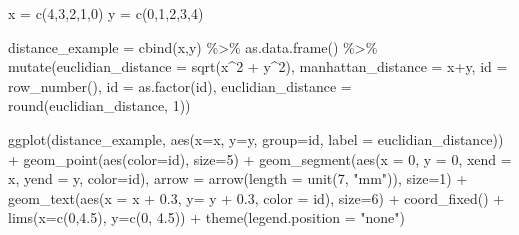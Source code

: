 \documentclass[
]{book}
\newenvironment{Shaded}{\begin{snugshade}}{\end{snugshade}}
\newcommand{\AttributeTok}[1]{\textcolor[rgb]{0.77,0.63,0.00}{#1}}
\newcommand{\DecValTok}[1]{\textcolor[rgb]{0.00,0.00,0.81}{#1}}
\newcommand{\FloatTok}[1]{\textcolor[rgb]{0.00,0.00,0.81}{#1}}
\newcommand{\FunctionTok}[1]{\textcolor[rgb]{0.00,0.00,0.00}{#1}}
\newcommand{\NormalTok}[1]{#1}
\newcommand{\OtherTok}[1]{\textcolor[rgb]{0.56,0.35,0.01}{#1}}
\newcommand{\SpecialCharTok}[1]{\textcolor[rgb]{0.00,0.00,0.00}{#1}}
\newcommand{\StringTok}[1]{\textcolor[rgb]{0.31,0.60,0.02}{#1}}
\begin{document}
\begin{Shaded}
\begin{Highlighting}[]
\NormalTok{x }\OtherTok{=} \FunctionTok{c}\NormalTok{(}\DecValTok{4}\NormalTok{,}\DecValTok{3}\NormalTok{,}\DecValTok{2}\NormalTok{,}\DecValTok{1}\NormalTok{,}\DecValTok{0}\NormalTok{)}
\NormalTok{y }\OtherTok{=} \FunctionTok{c}\NormalTok{(}\DecValTok{0}\NormalTok{,}\DecValTok{1}\NormalTok{,}\DecValTok{2}\NormalTok{,}\DecValTok{3}\NormalTok{,}\DecValTok{4}\NormalTok{)}

\NormalTok{distance\_example }\OtherTok{=} \FunctionTok{cbind}\NormalTok{(x,y) }\SpecialCharTok{\%\textgreater{}\%}
  \FunctionTok{as.data.frame}\NormalTok{() }\SpecialCharTok{\%\textgreater{}\%}
  \FunctionTok{mutate}\NormalTok{(}\AttributeTok{euclidian\_distance =} \FunctionTok{sqrt}\NormalTok{(x}\SpecialCharTok{\^{}}\DecValTok{2} \SpecialCharTok{+}\NormalTok{ y}\SpecialCharTok{\^{}}\DecValTok{2}\NormalTok{),}
         \AttributeTok{manhattan\_distance =}\NormalTok{ x}\SpecialCharTok{+}\NormalTok{y,}
         \AttributeTok{id =} \FunctionTok{row\_number}\NormalTok{(),}
         \AttributeTok{id =} \FunctionTok{as.factor}\NormalTok{(id),}
         \AttributeTok{euclidian\_distance =} \FunctionTok{round}\NormalTok{(euclidian\_distance, }\DecValTok{1}\NormalTok{))}

\FunctionTok{ggplot}\NormalTok{(distance\_example, }\FunctionTok{aes}\NormalTok{(}\AttributeTok{x=}\NormalTok{x, }\AttributeTok{y=}\NormalTok{y, }\AttributeTok{group=}\NormalTok{id, }\AttributeTok{label =}\NormalTok{ euclidian\_distance)) }\SpecialCharTok{+}
  \FunctionTok{geom\_point}\NormalTok{(}\FunctionTok{aes}\NormalTok{(}\AttributeTok{color=}\NormalTok{id), }\AttributeTok{size=}\DecValTok{5}\NormalTok{) }\SpecialCharTok{+}
  \FunctionTok{geom\_segment}\NormalTok{(}\FunctionTok{aes}\NormalTok{(}\AttributeTok{x =} \DecValTok{0}\NormalTok{, }\AttributeTok{y =} \DecValTok{0}\NormalTok{, }\AttributeTok{xend =}\NormalTok{ x, }\AttributeTok{yend =}\NormalTok{ y, }\AttributeTok{color=}\NormalTok{id), }\AttributeTok{arrow =} \FunctionTok{arrow}\NormalTok{(}\AttributeTok{length =} \FunctionTok{unit}\NormalTok{(}\DecValTok{7}\NormalTok{, }\StringTok{"mm"}\NormalTok{)), }\AttributeTok{size=}\DecValTok{1}\NormalTok{) }\SpecialCharTok{+}
  \FunctionTok{geom\_text}\NormalTok{(}\FunctionTok{aes}\NormalTok{(}\AttributeTok{x =}\NormalTok{ x }\SpecialCharTok{+} \FloatTok{0.3}\NormalTok{, }\AttributeTok{y=}\NormalTok{ y }\SpecialCharTok{+} \FloatTok{0.3}\NormalTok{, }\AttributeTok{color =}\NormalTok{ id), }\AttributeTok{size=}\DecValTok{6}\NormalTok{) }\SpecialCharTok{+} 
  \FunctionTok{coord\_fixed}\NormalTok{() }\SpecialCharTok{+} 
  \FunctionTok{lims}\NormalTok{(}\AttributeTok{x=}\FunctionTok{c}\NormalTok{(}\DecValTok{0}\NormalTok{,}\FloatTok{4.5}\NormalTok{), }\AttributeTok{y=}\FunctionTok{c}\NormalTok{(}\DecValTok{0}\NormalTok{, }\FloatTok{4.5}\NormalTok{)) }\SpecialCharTok{+} 
  \FunctionTok{theme}\NormalTok{(}\AttributeTok{legend.position =} \StringTok{"none"}\NormalTok{)}
\end{Highlighting}
\end{Shaded}
\end{document}
